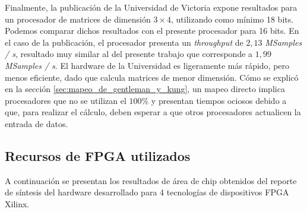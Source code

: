 Finalmente, la publicación de la Universidad de Victoria \cite{DongdongQR} expone resultados para un procesador de matrices de dimensión $3 \times 4$, utilizando como mínimo 18 bits. Podemos comparar dichos resultados con el presente procesador para 16 bits. En el caso de la publicación, el procesador presenta un \textit{throughput} de $2,13$ \textit{MSamples / s}, resultado muy similar al del presente trabajo que corresponde a $1,99$ \textit{MSamples / s}. El hardware de la Universidad es ligeramente más rápido, pero menos eficiente, dado que calcula matrices de menor dimensión. Cómo se explicó en la sección \ref{sec:mapeo_de_gentleman_y_kung}, un mapeo directo implica procesadores que no se utilizan el $100\%$ y presentan tiempos ociosos debido a que, para realizar el cálculo, deben esperar a que otros procesadores actualicen la entrada de datos.

\newpage

\subsection{Recursos de FPGA utilizados}

A continuación se presentan los resultados de área de chip obtenidos del reporte de síntesis del hardware desarrollado para 4 tecnologías de dispositivos FPGA Xilinx.

